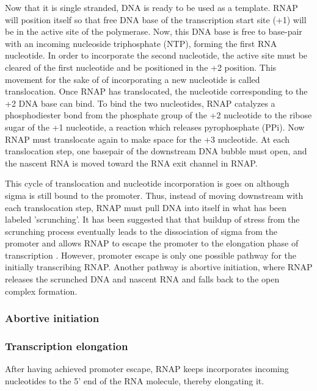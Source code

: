 Now that it is single stranded, DNA is ready to be used as a template. RNAP
will position itself so that free DNA base of the transcription start site (+1)
will be in the active site of the polymerase. Now, this DNA base is free to
base-pair with an incoming nucleoside triphosphate (NTP), forming the first RNA
nucleotide. In order to incorporate the second nucleotide, the active site must
be cleared of the first nucleotide and be positioned in the +2 position. This movement
for the sake of of incorporating a new nucleotide is called translocation. Once
RNAP has translocated, the nucleotide corresponding to the +2 DNA base can
bind. To bind the two nucleotides, RNAP catalyzes a phosphodiester bond from
the phosphate group of the +2 nucleotide to the ribose sugar of the +1
nucleotide, a reaction which releases pyrophosphate (PPi). Now RNAP must
translocate again to make space for the +3 nucleotide. At each translocation
step, one basepair of the downstream DNA bubble must open, and the nascent RNA
is moved toward the RNA exit channel in RNAP.

This cycle of translocation and nucleotide incorporation is goes on although
sigma is still bound to the promoter. Thus, instead of moving downstream with
each translocation step, RNAP must pull DNA into itself in what has been
labeled 'scrunching'. It has been suggested that that buildup of stress from
the scrunching process eventually leads to the dissociation of sigma from the
promoter and allows RNAP to escape the promoter to the elongation phase of
transcription \cite{revyakin_abortive_2006}. However, promoter escape is only
one possible pathway for the initially transcribing RNAP. Another pathway is
abortive initiation, where RNAP releases the scrunched DNA and nascent RNA and
falls back to the open complex formation.

\subsubsection{Abortive initiation}

\subsubsection{Transcription elongation}
After having achieved promoter escape, RNAP keeps incorporates incoming
nucleotides to the 5' end of the RNA molecule, thereby elongating it.

